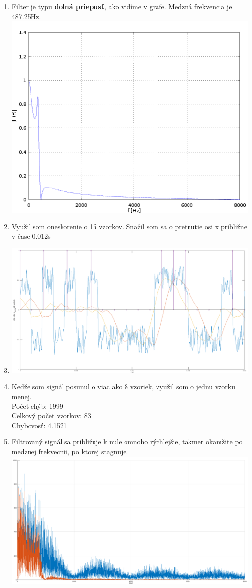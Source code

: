 \documentclass[a4paper,12pt,twocolumn]{article}
\begin{document}
\begin{enumerate}
\newpage
\item
Filter je typu \textbf{dolná priepusť}, ako vidíme v grafe. Medzná frekvencia je 487.25Hz.
\includegraphics[width=\linewidth]{4}
\item
Využil som oneskorenie o 15 vzorkov. Snažil som sa o pretnutie osi x približne v čase 0.012s
\item
\includegraphics[width=\linewidth]{6}
\item
Kedže som signál posunul o viac ako 8 vzoriek, využil som o jednu vzorku menej.\\
Počet chýb: 1999\\
Celkový počet vzorkov: 83\\
Chybovosť: 4.1521
\newpage
\item
Filtrovaný signál sa približuje k nule omnoho rýchlejšie, takmer okamžite po medznej frekvecnii, po ktorej stagnuje.
\includegraphics[width=\linewidth]{8}

\end{enumerate}
\end{document}
